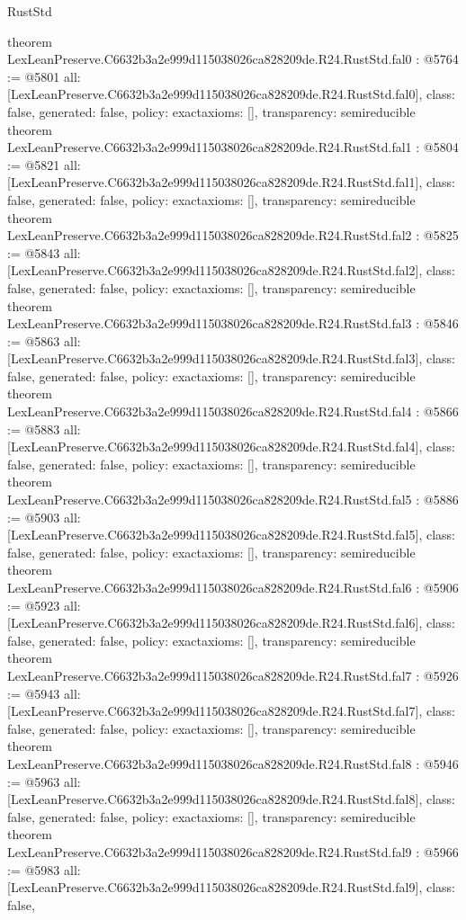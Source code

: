\begin{lexlean}{RustStd}
\begin{coremodule}
{}
theorem LexLeanPreserve.C6632b3a2e999d115038026ca828209de.R24.RustStd.fal0 : @5764 := @5801 {
  all: [LexLeanPreserve.C6632b3a2e999d115038026ca828209de.R24.RustStd.fal0],
  class: false,
  generated: false,
  policy: exact{axioms: []},
  transparency: semireducible
}
theorem LexLeanPreserve.C6632b3a2e999d115038026ca828209de.R24.RustStd.fal1 : @5804 := @5821 {
  all: [LexLeanPreserve.C6632b3a2e999d115038026ca828209de.R24.RustStd.fal1],
  class: false,
  generated: false,
  policy: exact{axioms: []},
  transparency: semireducible
}
theorem LexLeanPreserve.C6632b3a2e999d115038026ca828209de.R24.RustStd.fal2 : @5825 := @5843 {
  all: [LexLeanPreserve.C6632b3a2e999d115038026ca828209de.R24.RustStd.fal2],
  class: false,
  generated: false,
  policy: exact{axioms: []},
  transparency: semireducible
}
theorem LexLeanPreserve.C6632b3a2e999d115038026ca828209de.R24.RustStd.fal3 : @5846 := @5863 {
  all: [LexLeanPreserve.C6632b3a2e999d115038026ca828209de.R24.RustStd.fal3],
  class: false,
  generated: false,
  policy: exact{axioms: []},
  transparency: semireducible
}
theorem LexLeanPreserve.C6632b3a2e999d115038026ca828209de.R24.RustStd.fal4 : @5866 := @5883 {
  all: [LexLeanPreserve.C6632b3a2e999d115038026ca828209de.R24.RustStd.fal4],
  class: false,
  generated: false,
  policy: exact{axioms: []},
  transparency: semireducible
}
theorem LexLeanPreserve.C6632b3a2e999d115038026ca828209de.R24.RustStd.fal5 : @5886 := @5903 {
  all: [LexLeanPreserve.C6632b3a2e999d115038026ca828209de.R24.RustStd.fal5],
  class: false,
  generated: false,
  policy: exact{axioms: []},
  transparency: semireducible
}
theorem LexLeanPreserve.C6632b3a2e999d115038026ca828209de.R24.RustStd.fal6 : @5906 := @5923 {
  all: [LexLeanPreserve.C6632b3a2e999d115038026ca828209de.R24.RustStd.fal6],
  class: false,
  generated: false,
  policy: exact{axioms: []},
  transparency: semireducible
}
theorem LexLeanPreserve.C6632b3a2e999d115038026ca828209de.R24.RustStd.fal7 : @5926 := @5943 {
  all: [LexLeanPreserve.C6632b3a2e999d115038026ca828209de.R24.RustStd.fal7],
  class: false,
  generated: false,
  policy: exact{axioms: []},
  transparency: semireducible
}
theorem LexLeanPreserve.C6632b3a2e999d115038026ca828209de.R24.RustStd.fal8 : @5946 := @5963 {
  all: [LexLeanPreserve.C6632b3a2e999d115038026ca828209de.R24.RustStd.fal8],
  class: false,
  generated: false,
  policy: exact{axioms: []},
  transparency: semireducible
}
theorem LexLeanPreserve.C6632b3a2e999d115038026ca828209de.R24.RustStd.fal9 : @5966 := @5983 {
  all: [LexLeanPreserve.C6632b3a2e999d115038026ca828209de.R24.RustStd.fal9],
  class: false,
}
\end{coremodule}
\end{lexlean}
